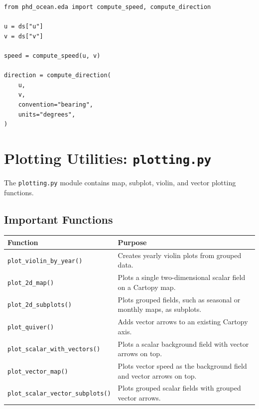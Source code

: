 \documentclass[11pt,a4paper]{article}
\begin{document}
\begin{lstlisting}[style=pythonstyle]
from phd_ocean.eda import compute_speed, compute_direction

u = ds["u"]
v = ds["v"]

speed = compute_speed(u, v)

direction = compute_direction(
    u,
    v,
    convention="bearing",
    units="degrees",
)
\end{lstlisting}

\section{Plotting Utilities: \texttt{plotting.py}}

The \texttt{plotting.py} module contains map, subplot, violin, and vector plotting functions.

\subsection{Important Functions}

\begin{longtable}{p{}p{}}
\toprule
\textbf{Function} & \textbf{Purpose} \\
\midrule
\endhead

\texttt{plot\_violin\_by\_year()} &
Creates yearly violin plots from grouped data. \\

\texttt{plot\_2d\_map()} &
Plots a single two-dimensional scalar field on a Cartopy map. \\

\texttt{plot\_2d\_subplots()} &
Plots grouped fields, such as seasonal or monthly maps, as subplots. \\

\texttt{plot\_quiver()} &
Adds vector arrows to an existing Cartopy axis. \\

\texttt{plot\_scalar\_with\_vectors()} &
Plots a scalar background field with vector arrows on top. \\

\texttt{plot\_vector\_map()} &
Plots vector speed as the background field and vector arrows on top. \\

\texttt{plot\_scalar\_vector\_subplots()} &
Plots grouped scalar fields with grouped vector arrows. \\

\bottomrule
\end{longtable}
\end{document}

